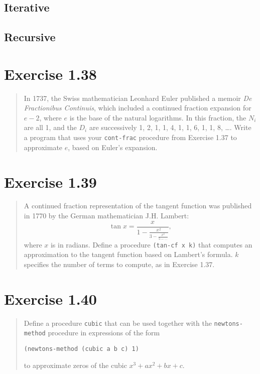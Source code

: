 \documentclass{article}
\begin{document}
\subsection{Iterative}


\subsection{Recursive}


\section{Exercise 1.38}
\begin{quote}
    In 1737, the Swiss mathematician Leonhard Euler published a memoir
    \textit{De Fractionibus Continuis}, which included a continued fraction
    expansion for $e−2$, where $e$ is the base of the natural logarithms. In
    this fraction, the $N_i$ are all 1, and the $D_i$ are successively 1, 2, 1,
    1, 4, 1, 1, 6, 1, 1, 8, \ldots. Write a program that uses your
    \texttt{cont-frac} procedure from Exercise 1.37 to approximate $e$, based
    on Euler’s expansion.
\end{quote}



\section{Exercise 1.39}
\begin{quote}
    A continued fraction representation of the tangent function was published
    in 1770 by the German mathematician J.H. Lambert:
    \begin{equation*}
        \tan{x}= \frac{x}{1-\frac{x^2}{3-\frac{x^2}{5-\ldots}}},
    \end{equation*}
    where $x$ is in radians. Define a procedure \texttt{(tan-cf x k)} that
    computes an approximation to the tangent function based on Lambert’s
    formula. $k$ specifies the number of terms to compute, as in Exercise 1.37.
\end{quote}



\section{Exercise 1.40}
\begin{quote}
    Define a procedure \texttt{cubic} that can be used together with the
    \texttt{newtons-method} procedure in expressions of the form
    \begin{lstlisting}
(newtons-method (cubic a b c) 1)
    \end{lstlisting}
    to approximate zeros of the cubic $x^3+ax^2+bx+c$.
\end{quote}


\end{document}
